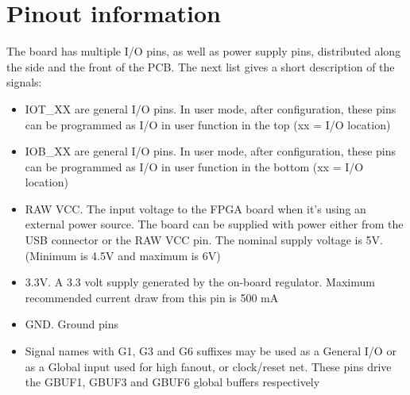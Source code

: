 \newpage
\section{Pinout information}
The board has multiple I/O pins, as well as power supply pins, distributed along the side and the front of the PCB. The next list gives a short description of the signals:
\begin{itemize}
	\item IOT\_XX are general I/O pins. In user mode, after configuration, these pins can be programmed as I/O in user function in the top (xx = I/O location)
	\item IOB\_XX are general I/O pins. In user mode, after configuration, these pins can be programmed as I/O in user function in the bottom (xx = I/O location)
	\item RAW VCC. The input voltage to the FPGA board when it's using an external power source. The board can be supplied with power either from the USB connector or the RAW VCC pin. The nominal supply voltage is 5V. (Minimum is 4.5V and maximum is 6V)
	\item 3.3V. A 3.3 volt supply generated by the on-board regulator. Maximum recommended current draw from this pin is 500 mA
	\item GND. Ground pins
	\item Signal names with G1, G3 and G6 suffixes may be used as a General I/O or as a Global input used for high fanout, or clock/reset net. These pins drive the GBUF1, GBUF3 and GBUF6 global buffers respectively
\end{itemize}

